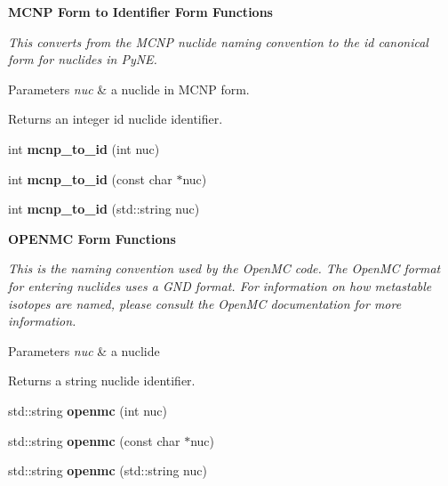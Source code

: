 \begin{Indent}\textbf{ M\+C\+NP Form to Identifier Form Functions}\par
{\em This converts from the M\+C\+NP nuclide naming convention to the id canonical form for nuclides in Py\+NE. 
\begin{DoxyParams}{Parameters}
{\em nuc} & a nuclide in M\+C\+NP form. \\
\hline
\end{DoxyParams}
\begin{DoxyReturn}{Returns}
an integer id nuclide identifier. 
\end{DoxyReturn}
}\begin{DoxyCompactItemize}
\item 
\mbox{\label{namespacepyne_1_1nucname_a08a6a5c718cf9f473ec04fea4f3d8136}} 
int {\bfseries mcnp\+\_\+to\+\_\+id} (int nuc)
\item 
\mbox{\label{namespacepyne_1_1nucname_a6bf4ccafa2128186744f101f0c19fe62}} 
int {\bfseries mcnp\+\_\+to\+\_\+id} (const char $\ast$nuc)
\item 
\mbox{\label{namespacepyne_1_1nucname_a9dfc39f06bbb535cb9df3bc06a1211ff}} 
int {\bfseries mcnp\+\_\+to\+\_\+id} (std\+::string nuc)
\end{DoxyCompactItemize}
\end{Indent}
\begin{Indent}\textbf{ O\+P\+E\+N\+MC Form Functions}\par
{\em This is the naming convention used by the Open\+MC code. The Open\+MC format for entering nuclides uses a G\+ND format. For information on how metastable isotopes are named, please consult the Open\+MC documentation for more information. 
\begin{DoxyParams}{Parameters}
{\em nuc} & a nuclide \\
\hline
\end{DoxyParams}
\begin{DoxyReturn}{Returns}
a string nuclide identifier. 
\end{DoxyReturn}
}\begin{DoxyCompactItemize}
\item 
\mbox{\label{namespacepyne_1_1nucname_abb034b9af6e3dc879acc4160fcd2adc8}} 
std\+::string {\bfseries openmc} (int nuc)
\item 
\mbox{\label{namespacepyne_1_1nucname_a66428a95cfc42fc819f22428de9827f4}} 
std\+::string {\bfseries openmc} (const char $\ast$nuc)
\item 
\mbox{\label{namespacepyne_1_1nucname_a7b84e6da6690344f24265f8cd5128143}} 
std\+::string {\bfseries openmc} (std\+::string nuc)
\end{DoxyCompactItemize}
\end{Indent}
